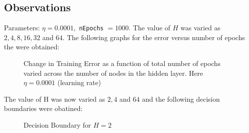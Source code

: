 \documentclass{article}
\begin{document}
\subsection{Observations}
Parameters: $\eta=0.0001,$ \verb|nEpochs| $=1000$. The value of $H$ was varied as $2,4,8,16,32$ and $64$. The following graphs for the error versus number of epochs the were obtained:
\begin{figure}[H]
 \caption{Change in Training Error as a function of total number of epochs varied across the number of nodes in the hidden layer. Here $\eta=0.0001$ (learning rate)}
 \label{fig:1}
 \end{figure}
 The value of H was now varied as $2,4$ and $64$ and the following decision boundaries were obatined:
 \begin{figure}[H]
 \caption{Decision Boundary for $H=2$}
 \label{fig:2}
 \end{figure}
\end{document}
